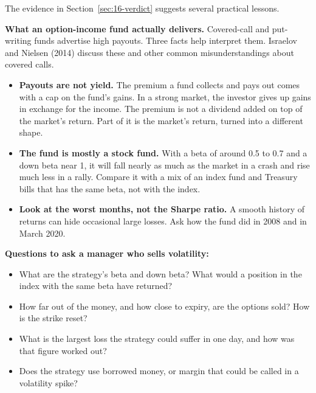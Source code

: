 The evidence in Section~\ref{sec:16-verdict} suggests several practical lessons.

\textbf{What an option-income fund actually delivers.} Covered-call and put-writing funds advertise high payouts. Three facts help interpret them. Israelov and Nielsen (2014) discuss these and other common misunderstandings about covered calls.

\begin{itemize}
  \item \textbf{Payouts are not yield.} The premium a fund collects and pays out comes with a cap on the fund's gains. In a strong market, the investor gives up gains in exchange for the income. The premium is not a dividend added on top of the market's return. Part of it is the market's return, turned into a different shape.
  \item \textbf{The fund is mostly a stock fund.} With a beta of around 0.5 to 0.7 and a down beta near 1, it will fall nearly as much as the market in a crash and rise much less in a rally. Compare it with a mix of an index fund and Treasury bills that has the same beta, not with the index.
  \item \textbf{Look at the worst months, not the Sharpe ratio.} A smooth history of returns can hide occasional large losses. Ask how the fund did in 2008 and in March 2020.
\end{itemize}

\textbf{Questions to ask a manager who sells volatility:}

\begin{itemize}
  \item What are the strategy's beta and down beta? What would a position in the index with the same beta have returned?
  \item How far out of the money, and how close to expiry, are the options sold? How is the strike reset?
  \item What is the largest loss the strategy could suffer in one day, and how was that figure worked out?
  \item Does the strategy use borrowed money, or margin that could be called in a volatility spike?
\end{itemize}

